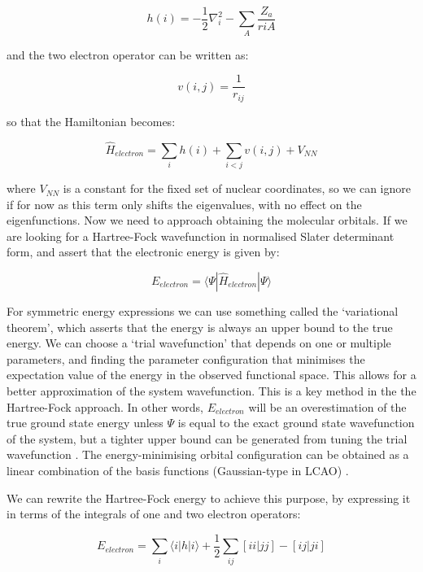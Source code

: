 \documentclass[10pt]{article}
\begin{document}
\begin{equation*}
	h(i) = -\frac{1}{2}\nabla_i^2-\sum_A\frac{Z_a}{r{iA}}
\end{equation*}

and the two electron operator can be written as:

\begin{equation*}
	v(i,j)=\frac{1}{r_{ij}}
\end{equation*}

so that the Hamiltonian becomes:

\begin{equation*}
	\hat{H}_{electron} = \sum_i h(i) + \sum_{i<j}v(i,j) + V_{NN}
\end{equation*}

where $V_{NN}$ is a constant for the fixed set of nuclear coordinates, so we can ignore if for now as this term only shifts the eigenvalues, with no effect on the eigenfunctions. Now we need to approach obtaining the molecular orbitals. If we are looking for a Hartree-Fock wavefunction in normalised Slater determinant form, and assert that the electronic energy is given by:

\begin{equation*}
	E_{electron} = \langle\Psi|\hat{H}_{electron}|\Psi\rangle
\end{equation*}

For symmetric energy expressions we can use something called the `variational theorem', which asserts that the energy is always an upper bound to the true energy. We can choose a `trial wavefunction' that depends on one or multiple parameters, and finding the parameter configuration that minimises the expectation value of the energy in the observed functional space. This allows for a better approximation of the system wavefunction. This is a key method in the the Hartree-Fock approach. In other words, $E_{electron}$ will be an overestimation of the true ground state energy unless $\Psi$ is equal to the exact ground state wavefunction of the system, but a tighter upper bound can be generated from tuning the trial wavefunction \cite{sakurai1994modern}. The energy-minimising orbital configuration can be obtained as a linear combination of the basis functions (Gaussian-type in LCAO) \cite{sherrill2000introduction}. 

We can rewrite the Hartree-Fock energy to achieve this purpose, by expressing it in terms of the integrals of one and two electron operators:

\begin{equation}
	E_{electron} = \sum_{i}\langle i|h|i\rangle + \frac{1}{2}\sum_{ij}[ii|jj]-[ij|ji]
\end{equation}
\end{document}
